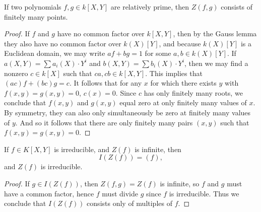 \begin{theorem}
    If two polynomials $f,g \in k[X,Y]$ are relatively prime, then $Z(f,g)$ consists of finitely many points.
\end{theorem}
\begin{proof}
    If $f$ and $g$ have no common factor over $k[X,Y]$, then by the Gauss lemma they also have no common factor over $k(X)[Y]$, and because $k(X)[Y]$ is a Euclidean domain, we may write $af + bg = 1$ for some $a,b \in k(X)[Y]$. If $a(X,Y) = \sum a_i(X) \cdot Y^i$ and $b(X,Y) = \sum b_i(X) \cdot Y^i$, then we may find a nonzero $c \in k[X]$ such that $ca, cb \in k[X,Y]$. This implies that $(ac)f + (bc)g = c$. It follows that for any $x$ for which there exists $y$ with $f(x,y) = g(x,y) = 0$, $c(x) = 0$. Since $c$ has only finitely many roots, we conclude that $f(x,y)$ and $g(x,y)$ equal zero at only finitely many values of $x$. By symmetry, they can also only simultaneously be zero at finitely many values of $y$. And so it follows that there are only finitely many pairs $(x,y)$ such that $f(x,y) = g(x,y) = 0$.
\end{proof}


\begin{corollary}
    If $f \in K[X,Y]$ is irreducible, and $Z(f)$ is infinite, then
    \[ I(Z(f)) = (f), \]
    and $Z(f)$ is irreducible.
\end{corollary}
\begin{proof}
    If $g \in I(Z(f))$, then $Z(f,g) = Z(f)$ is infinite, so $f$ and $g$ must have a common factor, hence $f$ must divide $g$ since $f$ is irreducible. Thus we conclude that $I(Z(f))$ consists only of multiples of $f$.
\end{proof}

